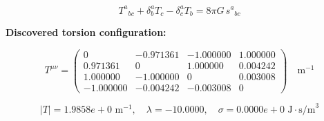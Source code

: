
\begin{equation}
  T^a{}_{bc} + \delta^a_b T_c - \delta^a_c T_b = 8\pi G \, s^a{}_{bc}
\end{equation}

\textbf{Discovered torsion configuration:}

\begin{equation}
  T^{\mu\nu} = \begin{pmatrix}
    0 & -0.971361 & -1.000000 & 1.000000 \\
    0.971361 & 0 & 1.000000 & 0.004242 \\
    1.000000 & -1.000000 & 0 & 0.003008 \\
    -1.000000 & -0.004242 & -0.003008 & 0
  \end{pmatrix} \quad \text{m}^{-1}
\end{equation}

\begin{equation}
  |T| = 1.9858e+0 \text{ m}^{-1}, \quad
  \lambda = -10.0000, \quad
  \sigma = 0.0000e+0 \text{ J}\cdot\text{s/m}^3
\end{equation}